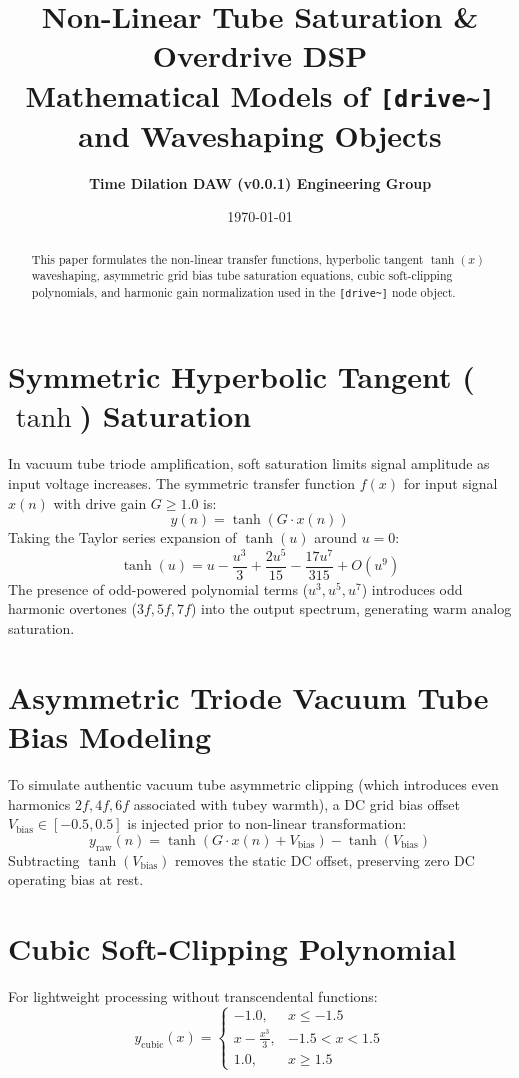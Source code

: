 \documentclass[11pt,a4paper]{article}
\title{\textbf{\Huge Non-Linear Tube Saturation \& Overdrive DSP}\\[0.5em]
\Large Mathematical Models of \texttt{[drive\textasciitilde{}]} and Waveshaping Objects}
\author{\textbf{Time Dilation DAW (v0.0.1) Engineering Group}}
\date{\today}
\begin{document}
\maketitle

\begin{abstract}
This paper formulates the non-linear transfer functions, hyperbolic tangent $\tanh(x)$ waveshaping, asymmetric grid bias tube saturation equations, cubic soft-clipping polynomials, and harmonic gain normalization used in the \texttt{[drive\textasciitilde{}]} node object.
\end{abstract}

\section{Symmetric Hyperbolic Tangent ($\tanh$) Saturation}
In vacuum tube triode amplification, soft saturation limits signal amplitude as input voltage increases. The symmetric transfer function $f(x)$ for input signal $x(n)$ with drive gain $G \ge 1.0$ is:
\begin{equation}
y(n) = \tanh\left( G \cdot x(n) \right)
\end{equation}
Taking the Taylor series expansion of $\tanh(u)$ around $u = 0$:
\begin{equation}
\tanh(u) = u - \frac{u^3}{3} + \frac{2u^5}{15} - \frac{17u^7}{315} + O(u^9)
\end{equation}
The presence of odd-powered polynomial terms ($u^3, u^5, u^7$) introduces odd harmonic overtones ($3f, 5f, 7f$) into the output spectrum, generating warm analog saturation.

\section{Asymmetric Triode Vacuum Tube Bias Modeling}
To simulate authentic vacuum tube asymmetric clipping (which introduces even harmonics $2f, 4f, 6f$ associated with tubey warmth), a DC grid bias offset $V_{\text{bias}} \in [-0.5, 0.5]$ is injected prior to non-linear transformation:
\begin{equation}
y_{\text{raw}}(n) = \tanh\left( G \cdot x(n) + V_{\text{bias}} \right) - \tanh(V_{\text{bias}})
\end{equation}
Subtracting $\tanh(V_{\text{bias}})$ removes the static DC offset, preserving zero DC operating bias at rest.

\section{Cubic Soft-Clipping Polynomial}
For lightweight processing without transcendental functions:
\begin{equation}
y_{\text{cubic}}(x) =
\begin{cases}
-1.0, & x \le -1.5 \\
x - \frac{x^3}{3}, & -1.5 < x < 1.5 \\
1.0, & x \ge 1.5
\end{cases}
\end{equation}
\end{document}
